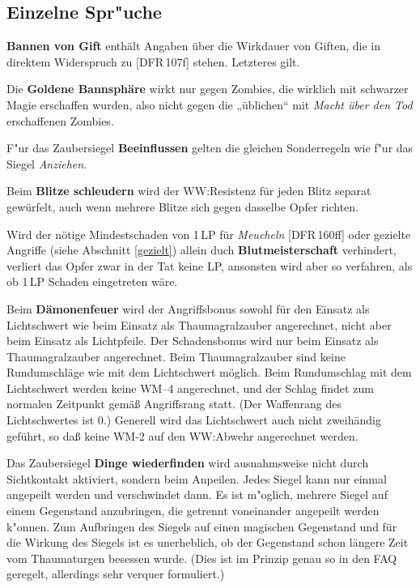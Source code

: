 \documentclass[10pt,a4paper,germanpar]{article}
\begin{document}
\subsection{Einzelne Spr"uche}

\textbf{Bannen von Gift} enthält Angaben über die Wirkdauer von
Giften, die in direktem Widerspruch zu [DFR\,107f] stehen. Letzteres
gilt.

Die \textbf{Goldene Bannsphäre} wirkt nur gegen Zombies, die wirklich
mit schwarzer Magie erschaffen wurden, also nicht gegen die
„üblichen“ mit \emph{Macht über den Tod} erschaffenen Zombies.

F"ur das Zaubersiegel \textbf{Beeinflussen} gelten die gleichen
Sonderregeln wie f"ur das Siegel \emph{Anziehen}.

Beim \textbf{Blitze schleudern} wird der WW:Resistenz für jeden Blitz separat
gewürfelt, auch wenn mehrere Blitze sich gegen dasselbe Opfer richten.

Wird der nötige Mindestschaden von 1\,LP für \emph{Meucheln}
[DFR\,160ff] oder gezielte Angriffe (siehe Abschnitt \ref{gezielt})
allein duch \textbf{Blutmeisterschaft} verhindert, verliert das Opfer
zwar in der Tat keine LP, ansonsten wird aber so verfahren, als ob
1\,LP Schaden eingetreten wäre.

Beim \textbf{Dämonenfeuer} wird der Angriffsbonus sowohl für den
Einsatz als Lichtschwert wie beim Einsatz als Thaumagralzauber
angerechnet, nicht aber beim Einsatz als Lichtpfeile. Der
Schadensbonus wird nur beim Einsatz als Thaumagralzauber
angerechnet. Beim Thaumagralzauber sind keine Rundumschläge wie mit
dem Lichtschwert möglich. Beim Rundumschlag mit dem Lichtschwert
werden keine WM--4 angerechnet, und der Schlag findet zum normalen
Zeitpunkt gemäß Angriffsrang statt. (Der Waffenrang des Lichtschwertes
ist 0.) Generell wird das Lichtschwert auch nicht zweihändig geführt,
so daß keine WM-2 auf den WW:Abwehr angerechnet werden.

Das Zaubersiegel \textbf{Dinge wiederfinden} wird ausnahmsweise nicht
durch Sichtkontakt aktiviert, sondern beim Anpeilen. Jedes Siegel kann 
nur einmal angepeilt werden und verschwindet dann. Es ist m"oglich,
mehrere Siegel auf einem Gegenstand anzubringen, die getrennt
voneinander angepeilt werden k"onnen. Zum Aufbringen des Siegels auf
einen magischen Gegenstand und für die Wirkung des Siegels ist es
unerheblich, ob der Gegenstand schon längere Zeit vom Thaumaturgen
besessen wurde. (Dies ist im Prinzip genau so in den FAQ geregelt,
allerdings sehr verquer formuliert.)
\end{document}
